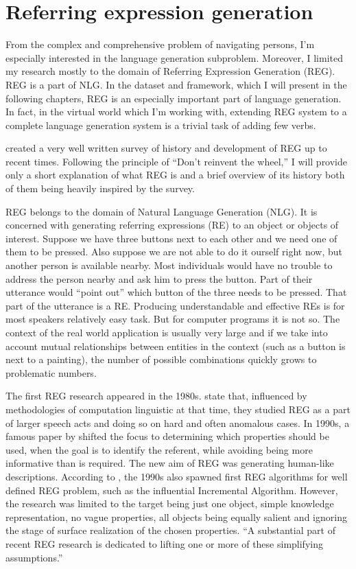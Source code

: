 \section{Referring expression generation}
\label{sec:bg-reg}
From the complex and comprehensive problem of navigating persons, I'm especially interested in the language generation subproblem. Moreover, I limited my research mostly to the domain of Referring Expression Generation (REG). REG is a part of NLG. In the dataset and framework, which I will present in the following chapters, REG is an especially important part of language generation. In fact, in the virtual world which I'm working with, extending REG system to a complete language generation system is a trivial task of adding few verbs.

\citet{krahmer2012computational} created a very well written survey of history and development of REG up to recent times. Following the principle of ``Don't reinvent the wheel,'' I will provide only a short explanation of what REG is and a brief overview of its history both of them being heavily inspired by the survey.

REG belongs to the domain of Natural Language Generation (NLG). It is concerned with generating referring expressions (RE) to an object or objects of interest. Suppose we have three buttons next to each other and we need one of them to be pressed. Also suppose we are not able to do it ourself right now, but another person is available nearby. Most individuals would have no trouble to address the person nearby and ask him to press the button. Part of their utterance would ``point out'' which button of the three needs to be pressed. That part of the utterance is a RE. Producing understandable and effective REs is for most speakers relatively easy task. But for computer programs it is not so. The context of the real world application is usually very large and if we take into account mutual relationships between entities in the context (such as a button is next to a painting), the number of possible combinations quickly grows to problematic numbers. 

The first REG research appeared in the 1980s. \citet{krahmer2012computational} state that, influenced by methodologies of computation linguistic at that time, they studied REG as a part of larger speech acts and doing so on hard and often anomalous cases. In 1990s, a famous paper by \citet{dale1995computational} shifted the focus to determining which properties should be used, when the goal is to identify the referent, while avoiding being more informative than is required. The new aim of REG was generating human-like descriptions.  According to \citet{krahmer2012computational}, the 1990s also spawned first REG algorithms for well defined REG problem, such as the influential Incremental Algorithm. However, the research was limited to the target being just one object, simple knowledge representation, no vague properties, all objects being equally salient and ignoring the stage of surface realization of the chosen properties. ``A substantial part of recent REG research is dedicated to lifting one or more of these simplifying assumptions.'' \citep{krahmer2012computational} 


